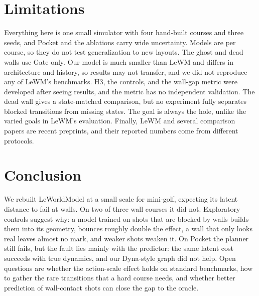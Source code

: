\documentclass[10pt,twocolumn]{article}
\begin{document}
\section{Limitations}
Everything here is one small simulator with four hand-built courses and three seeds, and Pocket and the ablations carry wide uncertainty. Models are per course, so they do not test generalization to new layouts. The ghost and dead walls use Gate only. Our model is much smaller than LeWM and differs in architecture and history, so results may not transfer, and we did not reproduce any of LeWM's benchmarks. H3, the controls, and the wall-gap metric were developed after seeing results, and the metric has no independent validation. The dead wall gives a state-matched comparison, but no experiment fully separates blocked transitions from missing states. The goal is always the hole, unlike the varied goals in LeWM's evaluation. Finally, LeWM and several comparison papers are recent preprints, and their reported numbers come from different protocols.

\section{Conclusion}
We rebuilt LeWorldModel at a small scale for mini-golf, expecting its latent distance to fail at walls. On two of three wall courses it did not. Exploratory controls suggest why: a model trained on shots that are blocked by walls builds them into its geometry, bounces roughly double the effect, a wall that only looks real leaves almost no mark, and weaker shots weaken it. On Pocket the planner still fails, but the fault lies mainly with the predictor: the same latent cost succeeds with true dynamics, and our Dyna-style graph did not help. Open questions are whether the action-scale effect holds on standard benchmarks, how to gather the rare transitions that a hard course needs, and whether better prediction of wall-contact shots can close the gap to the oracle.
\end{document}
